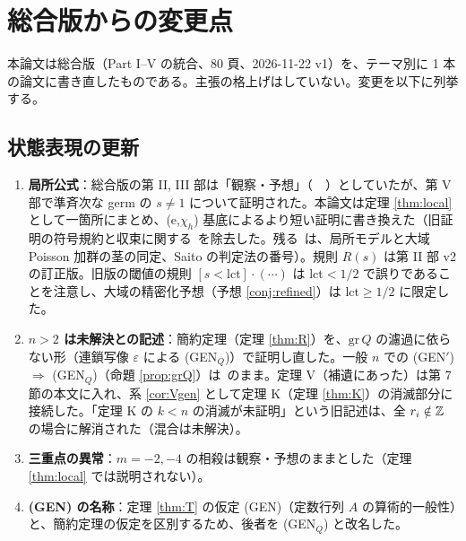 \appendix
\section{総合版からの変更点}\label{app:changes}
本論文は総合版（Part I--V の統合、80 頁、2026-11-22 v1）を、テーマ別に 1 本の論文に書き直したものである。主張の格上げはしていない。変更を以下に列挙する。

\subsection{状態表現の更新}
\begin{enumerate}
\item \textbf{局所公式}：総合版の第 II, III 部は「観察・予想」（\tP\ \tV\ \tK）としていたが、第 V 部で準斉次な germ の $s\ne1$ について証明された。本論文は定理 \ref{thm:local} として一箇所にまとめ、(e,$\chi_h$) 基底によるより短い証明に書き換えた（旧証明の符号規約と収束に関する\tQ\ を除去した。残る\tQ\ は、局所モデルと大域 Poisson 加群の茎の同定、Saito の判定法の番号）。規則 $R(s)$ は第 II 部 v2 の訂正版。旧版の閾値の規則 $[s<\mathrm{lct}]\cdot(\cdots)$ は $\mathrm{lct}<1/2$ で誤りであることを注意し、大域の精密化予想（予想 \ref{conj:refined}）は $\mathrm{lct}\ge1/2$ に限定した。
\item \textbf{$n>2$ は未解決との記述}：簡約定理（定理 \ref{thm:R}）を、$\mathrm{gr}\,Q$ の濾過に依らない形（連鎖写像 $\varepsilon$ による (GEN$_Q$)）で証明し直した。一般 $n$ での (GEN$'$) $\Rightarrow$ (GEN$_Q$)（命題 \ref{prop:grQ}）は\tQ\ のまま。定理 V（補遺にあった）は第 7 節の本文に入れ、系 \ref{cor:Vgen} として定理 K（定理 \ref{thm:K}）の消滅部分に接続した。「定理 K の $k<n$ の消滅が未証明」という旧記述は、全 $r_i\notin\mathbb Z$ の場合に解消された（混合は未解決）。
\item \textbf{三重点の異常}：$m=-2,-4$ の相殺は観察・予想のままとした（定理 \ref{thm:local} では説明されない）。
\item \textbf{(GEN) の名称}：定理 \ref{thm:T} の仮定 (GEN)（定数行列 $A$ の算術的一般性）と、簡約定理の仮定を区別するため、後者を (GEN$_Q$) と改名した。
\end{enumerate}

